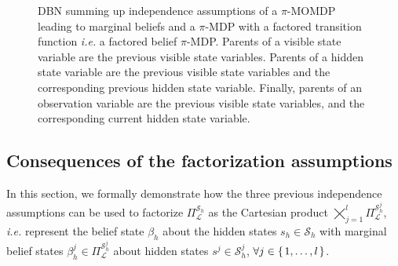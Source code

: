 \begin{figure}[b!]
\caption[DBN of a factored belief-independent $\pi$-MOMDP]{
DBN summing up independence assumptions of a $\pi$-MOMDP
leading to marginal beliefs and a $\pi$-MDP with 
a factored transition function \textit{i.e.} a factored belief $\pi$-MDP.
Parents of a visible state variable are the previous visible state variables.
Parents of a hidden state variable are the previous visible state variables 
and the corresponding previous hidden state variable. 
Finally,
parents of an observation variable are the previous visible state variables,
and the corresponding current hidden state variable.
}
\label{fig_piMOMDPFact}
\end{figure}

\subsection{Consequences of the factorization assumptions}
\label{section_factoAssumptions}
In this section, we formally demonstrate how the three previous independence assumptions can be
used to factorize $\Pi^{\mathcal{S}_h}_{\mathcal{L}}$ 
as the Cartesian product $\displaystyle \bigtimes_{j=1}^{l} \Pi^{\mathcal{S}^j_h}_{\mathcal{L}}$,
\textit{i.e.} represent the belief state $\beta_h$ about the hidden states $s_h \in \mathcal{S}_h$ 
with marginal belief states $\beta^j_h \in \Pi^{\mathcal{S}^j_h}_{\mathcal{L}}$
about hidden states $s^j \in \mathcal{S}^j_h$, $\forall j \in \left\{ \left. 1,\ldots,l \right. \right\}$.

